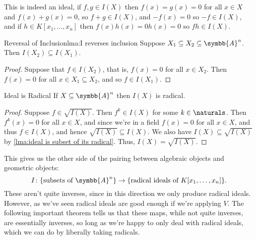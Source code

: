 \documentclass[fleqn]{NotesClass}
\newcommand{\affine}{\symbb{A}}
\begin{document}
    This is indeed an ideal, if \(f, g \in I(X)\) then \(f(x) = g(x) = 0\) for all \(x \in X\) and \(f(x) + g(x) = 0\), so \(f + g \in I(X)\), and \(-f(x) = 0\) so \(-f \in I(X)\), and if \(h \in K[x_1,\dotsc, x_n]\) then \(f(x)h(x) = 0h(x) = 0\) so \(fh \in I(X)\).
    
    \begin{lma}{Reversal of Inclusion}{lma:I reverses inclusion}
        Suppose \(X_1 \subseteq X_2 \subseteq \affine^n\).
        Then \(I(X_2) \subseteq I(X_1)\).
        \begin{proof}
            Suppose that \(f \in I(X_2)\), that is, \(f(x) = 0\) for all \(x \in X_2\).
            Then \(f(x) = 0\) for all \(x \in X_1 \subseteq X_2\), and so \(f \in I(X_1)\).
        \end{proof}
    \end{lma}
    
    \begin{lma}{Ideal is Radical}{}
        If \(X \subseteq \affine^n\) then \(I(X)\) is radical.
        \begin{proof}
            Suppose \(f \in \sqrt{I(X)}\).
            Then \(f^k \in I(X)\) for some \(k \in \naturals\).
            Then \(f^k(x) = 0\) for all \(x \in X\), and since we're in a field \(f(x) = 0\) for all \(x \in X\), and thus \(f \in I(X)\), and hence \(\sqrt{I(X)} \subseteq I(X)\).
            We also have \(I(X) \subseteq \sqrt{I(X)}\) by \cref{lma:ideal is subset of its radical}.
            Thus, \(I(X) = \sqrt{I(X)}\).
        \end{proof}
    \end{lma}
    
    \begin{remark}{}{}
        This gives us the other side of the pairing between algebraic objects and geometric objects:
        \begin{equation}
            I \colon \{\text{subsets of } \affine^n\} \to \{\text{radical ideals of } K[x_1, \dotsc, x_n]\}.
        \end{equation}
        These aren't quite inverses, since in this direction we only produce radical ideals.
        However, as we've seen radical ideals are good enough if we're applying \(V\).
        The following important theorem tells us that these maps, while not quite inverses, are essentially inverses, so long as we're happy to only deal with radical ideals, which we can do by liberally taking radicals.
    \end{remark}
    
\end{document}
